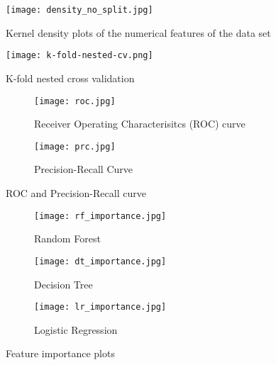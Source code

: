 \begin{figure}[ht]
    \centering
    \texttt{[image: density\_no\_split.jpg]}
    \caption{Kernel density plots of the numerical features of the data set}
    \label{fig:density}
\end{figure}
\begin{figure}[ht]
 \centering
 \texttt{[image: k-fold-nested-cv.png]}
 \caption{K-fold nested cross validation}
 \label{fig:cv}
\end{figure}
\begin{figure}
 \centering
 \begin{subfigure}{0.6\textwidth}
  \centering
  \texttt{[image: roc.jpg]}
  \caption{Receiver Operating Characterisitcs (ROC) curve}
  \label{fig:roc}
 \end{subfigure}
 \begin{subfigure}{0.6\textwidth}
  \centering
  \texttt{[image: prc.jpg]}
  \caption{Precision-Recall Curve}
  \label{fig:prc}
 \end{subfigure}
 \caption{ROC and Precision-Recall curve}
 \label{fig:prc-roc}
\end{figure}

\begin{figure}
 \begin{subfigure}{0.5\textwidth}
  \texttt{[image: rf\_importance.jpg]}
  \caption{Random Forest}
  \label{fig:rf_importance}
 \end{subfigure}
 \begin{subfigure}{0.5\textwidth}
  \texttt{[image: dt\_importance.jpg]}
  \caption{Decision Tree}
  \label{fig:dt_importance}
 \end{subfigure}
 \begin{subfigure}{\textwidth}
 \centering
  \texttt{[image: lr\_importance.jpg]}
  \caption{Logistic Regression}
  \label{fig:lr_importance}
 \end{subfigure}
 \caption{Feature importance plots}
 \label{fig:feature-importance}
\end{figure}

